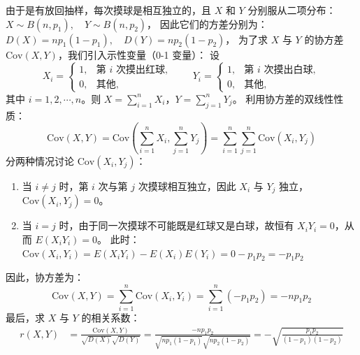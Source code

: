 \documentclass[lang=cn,11pt]{elegantbook}
\begin{document}
\begin{solution}
由于是有放回抽样，每次摸球是相互独立的，且 $X$ 和 $Y$ 分别服从二项分布：
\(
X \sim B(n, p_1), \quad Y \sim B(n, p_2)
\)，
因此它们的方差分别为：
\(
D(X) = np_1(1-p_1), \quad D(Y) = np_2(1-p_2)
\)，
为了求 $X$ 与 $Y$ 的协方差 $\text{Cov}(X,Y)$，我们引入示性变量（0-1 变量）：
设 
\[
X_i = \begin{cases}
1, & \text{第 } i \text{ 次摸出红球}, \\
0, & \text{其他},
\end{cases}
\qquad
Y_i = \begin{cases}
1, & \text{第 } i \text{ 次摸出白球}, \\
0, & \text{其他},
\end{cases}
\]
其中 $i = 1, 2, \cdots, n$。则 $X = \sum\limits_{i=1}^n X_i$，$Y = \sum\limits_{j=1}^n Y_j$。
利用协方差的双线性性质：
\[
\text{Cov}(X, Y) = \text{Cov}\left(\sum_{i=1}^n X_i, \sum_{j=1}^n Y_j\right) = \sum_{i=1}^n \sum_{j=1}^n \text{Cov}(X_i, Y_j)
\]
分两种情况讨论 $\text{Cov}(X_i, Y_j)$：
\begin{enumerate}
    \item[(1)] 当 $i \neq j$ 时，第 $i$ 次与第 $j$ 次摸球相互独立，因此 $X_i$ 与 $Y_j$ 独立，$\text{Cov}(X_i, Y_j) = 0$。
    \item[(2)] 当 $i = j$ 时，由于同一次摸球不可能既是红球又是白球，故恒有 $X_i Y_i = 0$，从而 $E(X_i Y_i) = 0$。
    此时：
    \(
    \text{Cov}(X_i, Y_i) = E(X_i Y_i) - E(X_i)E(Y_i) = 0 - p_1 p_2 = -p_1 p_2
    \)
\end{enumerate}
因此，协方差为：
\[
\text{Cov}(X,Y) = \sum_{i=1}^n \text{Cov}(X_i, Y_i) = \sum_{i=1}^n (-p_1 p_2) = -n p_1 p_2
\]
最后，求 $X$ 与 $Y$ 的相关系数：
\begin{align*}
r(X,Y) &= \frac{\text{Cov}(X,Y)}{\sqrt{D(X)} \sqrt{D(Y)}} = \frac{-n p_1 p_2}{\sqrt{np_1(1-p_1)} \sqrt{np_2(1-p_2)}} = -\sqrt{\frac{p_1 p_2}{(1-p_1)(1-p_2)}}
\end{align*}
\end{solution}
\end{document}
